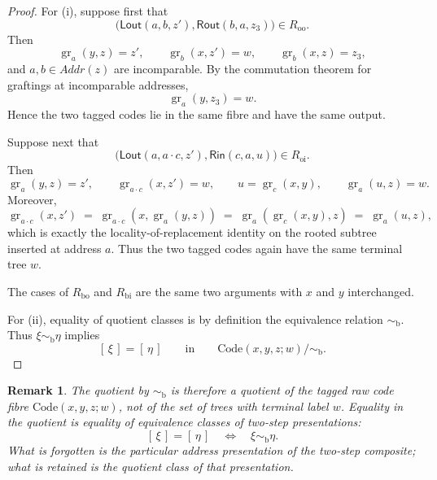 \documentclass[11pt]{article}
\newtheorem{remark}[theorem]{Remark}
\newcommand{\Addr}{\mathit{Addr}}
\newcommand{\graftat}[3]{\operatorname{gr}_{#2}(#3,#1)}
\begin{document}
\begin{proof}
For \textup{(i)}, suppose first that
\[
\bigl(\mathsf{Lout}(a,b,z'),\mathsf{Rout}(b,a,z_3)\bigr)\in R_{\mathrm{oo}}.
\]
Then
\[
\graftat{z}{a}{y}=z',
\qquad
\graftat{z'}{b}{x}=w,
\qquad
\graftat{z}{b}{x}=z_3,
\]
and \(a,b\in \Addr(z)\) are incomparable. By the commutation theorem for
graftings at incomparable addresses,
\[
\graftat{z_3}{a}{y}=w.
\]
Hence the two tagged codes lie in the same fibre and have the same output.

Suppose next that
\[
\bigl(\mathsf{Lout}(a,a\cdot c,z'),\mathsf{Rin}(c,a,u)\bigr)\in R_{\mathrm{oi}}.
\]
Then
\[
\graftat{z}{a}{y}=z',
\qquad
\graftat{z'}{a\cdot c}{x}=w,
\qquad
u=\graftat{y}{c}{x},
\qquad
\graftat{z}{a}{u}=w.
\]
Moreover,
\[
\graftat{z'}{a\cdot c}{x}
\;=\;
\graftat{\graftat{z}{a}{y}}{a\cdot c}{x}
\;=\;
\graftat{z}{a}{\graftat{y}{c}{x}}
\;=\;
\graftat{z}{a}{u},
\]
which is exactly the locality-of-replacement identity on the rooted subtree
inserted at address \(a\). Thus the two tagged codes again have the same
terminal tree \(w\).

The cases of \(R_{\mathrm{bo}}\) and \(R_{\mathrm{bi}}\) are the same two
arguments with \(x\) and \(y\) interchanged.

For \textup{(ii)}, equality of quotient classes is by definition the
equivalence relation \(\sim_{\mathrm b}\). Thus \(\xi\sim_{\mathrm b}\eta\)
implies
\[
[\,\xi\,]=[\,\eta\,]
\qquad\text{in}\qquad
\mathrm{Code}(x,y,z;w)/{\sim_{\mathrm b}}.
\]
\end{proof}

\begin{remark}
The quotient by \(\sim_{\mathrm b}\) is therefore a quotient of the tagged raw
code fibre \(\mathrm{Code}(x,y,z;w)\), not of the set of trees with terminal
label \(w\). Equality in the quotient is equality of equivalence classes of
two-step presentations:
\[
[\,\xi\,]=[\,\eta\,]
\quad\Longleftrightarrow\quad
\xi\sim_{\mathrm b}\eta.
\]
What is forgotten is the particular address presentation of the two-step
composite; what is retained is the quotient class of that presentation.
\end{remark}
\end{document}
